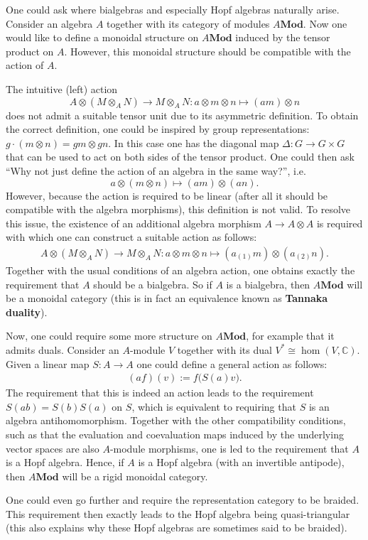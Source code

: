     \begin{remark}
        One could ask where bialgebras and especially Hopf algebras naturally arise. Consider an algebra $A$ together with its category of modules $A\mathbf{Mod}$. Now one would like to define a monoidal structure on $A\mathbf{Mod}$ induced by the tensor product on $A$. However, this monoidal structure should be compatible with the action of $A$.

        The intuitive (left) action \[A\otimes(M\otimes_A N)\rightarrow M\otimes_AN: a\otimes m\otimes n\mapsto (am)\otimes n\] does not admit a suitable tensor unit due to its asymmetric definition. To obtain the correct definition, one could be inspired by group representations: $g\cdot(m\otimes n) = gm\otimes gn$. In this case one has the diagonal map $\Delta:G\rightarrow G\times G$ that can be used to act on both sides of the tensor product. One could then ask ``Why not just define the action of an algebra in the same way?'', i.e.~\[a\otimes (m\otimes n)\mapsto (am)\otimes(an).\] However, because the action is required to be linear (after all it should be compatible with the algebra morphisms), this definition is not valid. To resolve this issue, the existence of an additional algebra morphism $A\rightarrow A\otimes A$ is required with which one can construct a suitable action as follows:
        \begin{gather}
            A\otimes(M\otimes_AN)\rightarrow M\otimes_AN:a\otimes m\otimes n\mapsto (a_{(1)}m)\otimes(a_{(2)}n).
        \end{gather}
        Together with the usual conditions of an algebra action, one obtains exactly the requirement that $A$ should be a bialgebra. So if $A$ is a bialgebra, then $A\mathbf{Mod}$ will be a monoidal category (this is in fact an equivalence known as \textbf{Tannaka duality}).

        Now, one could require some more structure on $A\mathbf{Mod}$, for example that it admits duals. Consider an $A$-module $V$ together with its dual $V^*\cong\hom(V,\mathbb{C})$. Given a linear map $S:A\rightarrow A$ one could define a general action as follows:
        \begin{gather}
            (af)(v) := f\big(S(a)v\big).
        \end{gather}
        The requirement that this is indeed an action leads to the requirement $S(ab) = S(b)S(a)$ on $S$, which is equivalent to requiring that $S$ is an algebra antihomomorphism. Together with the other compatibility conditions, such as that the evaluation and coevaluation maps induced by the underlying vector spaces are also $A$-module morphisms, one is led to the requirement that $A$ is a Hopf algebra. Hence, if $A$ is a Hopf algebra (with an invertible antipode), then $A\mathbf{Mod}$ will be a rigid monoidal category.

        One could even go further and require the representation category to be braided. This requirement then exactly leads to the Hopf algebra being quasi-triangular (this also explains why these Hopf algebras are sometimes said to be braided).
    \end{remark}

